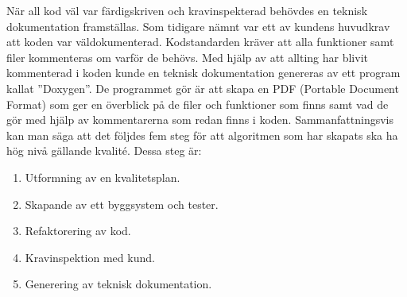 \newline
\newline
När all kod väl var färdigskriven och kravinspekterad behövdes en teknisk dokumentation framställas. Som tidigare nämnt var ett av kundens huvudkrav att koden var väldokumenterad. Kodstandarden kräver att alla funktioner samt filer kommenteras om varför de behövs. Med hjälp av att allting har blivit kommenterad i koden kunde en teknisk dokumentation genereras av ett program kallat ''Doxygen''. De programmet gör är att skapa en PDF (Portable Document Format) som ger en överblick på de filer och funktioner som finns samt vad de gör med hjälp av kommentarerna som redan finns i koden.
\newline
\newline
Sammanfattningsvis kan man säga att det följdes fem steg för att algoritmen som har skapats ska ha hög nivå gällande kvalité. Dessa steg är:

\begin{enumerate}
\item{Utformning av en kvalitetsplan.}
\item{Skapande av ett byggsystem och tester.}
\item{Refaktorering av kod.}
\item{Kravinspektion med kund.}
\item{Generering av teknisk dokumentation.}
\end{enumerate}
 
